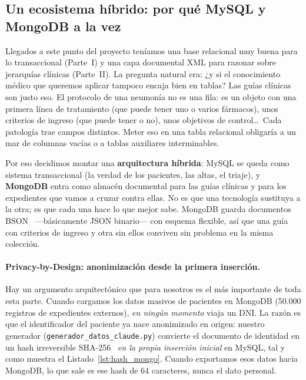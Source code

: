 \documentclass[../main.tex]{subfiles}
\begin{document}
\subsection{Un ecosistema híbrido: por qué MySQL y MongoDB a la vez}

Llegados a este punto del proyecto teníamos una base relacional muy buena para lo transaccional (Parte~I) y una capa documental XML para razonar sobre jerarquías clínicas (Parte~II). La pregunta natural era: ¿y si el conocimiento médico que queremos aplicar tampoco encaja bien en tablas? Las guías clínicas son justo eso. El protocolo de una neumonía no es una fila: es un objeto con una primera línea de tratamiento (que puede tener uno o varios fármacos), unos criterios de ingreso (que puede tener o no), unos objetivos de control\ldots\ Cada patología trae campos distintos. Meter eso en una tabla relacional obligaría a un mar de columnas vacías o a tablas auxiliares interminables.

Por eso decidimos montar una \textbf{arquitectura híbrida}: MySQL se queda como sistema transaccional (la verdad de los pacientes, las altas, el triaje), y \textbf{MongoDB} entra como almacén documental para las guías clínicas y para los expedientes que vamos a cruzar contra ellas. No es que una tecnología sustituya a la otra; es que cada una hace lo que mejor sabe. MongoDB guarda documentos BSON~\cite{bsonspec} ---básicamente JSON binario--- con esquema flexible, así que una guía con criterios de ingreso y otra sin ellos conviven sin problema en la misma colección.

\paragraph{Privacy-by-Design: anonimización desde la primera inserción.}
Hay un argumento arquitectónico que para nosotros es el más importante de toda esta parte. Cuando cargamos los datos masivos de pacientes en MongoDB (50.000 registros de expedientes externos), \textit{en ningún momento} viaja un DNI. La razón es que el identificador del paciente ya nace anonimizado en origen: nuestro generador (\texttt{generador\_datos\_claude.py}) convierte el documento de identidad en un hash irreversible SHA-256~\cite{fips180sha256} \textit{en la propia inserción inicial} en MySQL, tal y como muestra el Listado~\ref{lst:hash_mongo}. Cuando exportamos esos datos hacia MongoDB, lo que sale es ese hash de 64 caracteres, nunca el dato personal.
\end{document}
